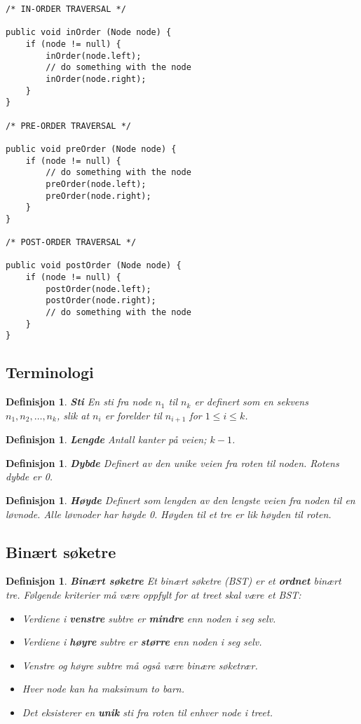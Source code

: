 \documentclass[11pt,a4paper]{article}
\theoremstyle{def}
\newtheorem{definition}[subsection]{Definisjon}
\begin{document}
\begin{lstlisting}[frame=none]
/* IN-ORDER TRAVERSAL */

public void inOrder (Node node) {
	if (node != null) {
		inOrder(node.left);
		// do something with the node
		inOrder(node.right);
	}
}

/* PRE-ORDER TRAVERSAL */

public void preOrder (Node node) {
	if (node != null) {
		// do something with the node
		preOrder(node.left);
		preOrder(node.right);
	}
}

/* POST-ORDER TRAVERSAL */

public void postOrder (Node node) {
	if (node != null) {
		postOrder(node.left);
		postOrder(node.right);
		// do something with the node
	}
}
\end{lstlisting}

\vspace{-25pt}

\subsection{Terminologi}
\begin{definition}
\emph{\textbf{Sti}}
En sti fra node $n_1$ til $n_k$ er definert som en sekvens $n_1, n_2, \dots, n_k$, slik at $n_i$ er forelder til $n_{i+1}$ for $1 \leq i \leq k$.
\end{definition}
\begin{definition}
\emph{\textbf{Lengde}}
Antall \textit{kanter} på veien; $k-1$.
\end{definition}
\begin{definition}
\emph{\textbf{Dybde}}
Definert av den unike veien fra roten til noden. Rotens dybde er 0.
\end{definition}
\begin{definition}
\emph{\textbf{Høyde}}
Definert som lengden av den \textit{lengste} veien fra noden til en løvnode. Alle løvnoder har høyde 0. Høyden til et tre er lik høyden til roten.
\end{definition}

\subsection{Binært søketre}

\begin{definition}
\emph{\textbf{Binært søketre}}
Et binært søketre (BST) er et \textbf{ordnet} binært tre. Følgende kriterier må være oppfylt for at treet skal være et BST:
\begin{itemize}
\item
Verdiene i \textbf{venstre} subtre er \textbf{mindre} enn noden i seg selv.
\item
Verdiene i \textbf{høyre} subtre er \textbf{større} enn noden i seg selv.
\item
Venstre og høyre subtre må også være binære søketrær.
\item
Hver node kan ha maksimum to barn.
\item
Det eksisterer en \textbf{unik} sti fra roten til enhver node i treet.
\end{itemize}
\end{definition}
\end{document}
